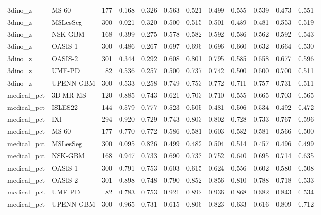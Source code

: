 \begin{tabular}{llrrrrrrrrrr}
3dino\_z & MS-60 & 177 & 0.168 & 0.326 & 0.563 & 0.521 & 0.499 & 0.555 & 0.539 & 0.473 & 0.551 \\
3dino\_z & MSLesSeg & 300 & 0.021 & 0.320 & 0.500 & 0.515 & 0.501 & 0.489 & 0.481 & 0.553 & 0.519 \\
3dino\_z & NSK-GBM & 168 & 0.399 & 0.275 & 0.578 & 0.582 & 0.592 & 0.586 & 0.562 & 0.592 & 0.543 \\
3dino\_z & OASIS-1 & 300 & 0.486 & 0.267 & 0.697 & 0.696 & 0.696 & 0.660 & 0.632 & 0.664 & 0.530 \\
3dino\_z & OASIS-2 & 301 & 0.344 & 0.292 & 0.608 & 0.801 & 0.795 & 0.585 & 0.558 & 0.677 & 0.596 \\
3dino\_z & UMF-PD & 82 & 0.536 & 0.257 & 0.500 & 0.737 & 0.742 & 0.500 & 0.500 & 0.700 & 0.511 \\
3dino\_z & UPENN-GBM & 300 & 0.533 & 0.258 & 0.749 & 0.753 & 0.772 & 0.711 & 0.757 & 0.731 & 0.511 \\
medical\_pct & 3D-MR-MS & 120 & 0.885 & 0.743 & 0.621 & 0.703 & 0.710 & 0.555 & 0.665 & 0.703 & 0.565 \\
medical\_pct & ISLES22 & 144 & 0.579 & 0.777 & 0.523 & 0.505 & 0.481 & 0.506 & 0.534 & 0.492 & 0.472 \\
medical\_pct & IXI & 294 & 0.920 & 0.729 & 0.743 & 0.803 & 0.802 & 0.728 & 0.733 & 0.767 & 0.596 \\
medical\_pct & MS-60 & 177 & 0.770 & 0.772 & 0.586 & 0.581 & 0.603 & 0.582 & 0.581 & 0.566 & 0.500 \\
medical\_pct & MSLesSeg & 300 & 0.095 & 0.826 & 0.499 & 0.482 & 0.504 & 0.514 & 0.457 & 0.496 & 0.499 \\
medical\_pct & NSK-GBM & 168 & 0.947 & 0.733 & 0.690 & 0.733 & 0.752 & 0.640 & 0.695 & 0.714 & 0.635 \\
medical\_pct & OASIS-1 & 300 & 0.791 & 0.753 & 0.603 & 0.615 & 0.624 & 0.556 & 0.602 & 0.580 & 0.508 \\
medical\_pct & OASIS-2 & 301 & 0.898 & 0.748 & 0.790 & 0.852 & 0.856 & 0.810 & 0.788 & 0.718 & 0.533 \\
medical\_pct & UMF-PD & 82 & 0.783 & 0.753 & 0.921 & 0.892 & 0.936 & 0.868 & 0.882 & 0.843 & 0.534 \\
medical\_pct & UPENN-GBM & 300 & 0.965 & 0.731 & 0.615 & 0.806 & 0.823 & 0.633 & 0.616 & 0.809 & 0.712 \\
\bottomrule
\end{tabular}
